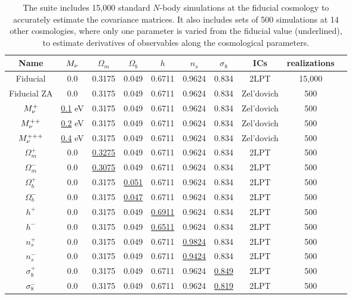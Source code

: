 \begin{table}
\caption{
The \quij suite includes 15,000 standard $N$-body simulations at the fiducial cosmology to 
accurately estimate the covariance matrices. It also includes sets of 500 simulations at 14 
other cosmologies, where only one parameter is varied from the fiducial value (underlined), 
to estimate derivatives of observables along the cosmological parameters.
} 
\begin{center}
\begin{tabular}{cccccccccc} \toprule
Name  &$M_\nu$ & $\Omega_m$ & $\Omega_b$ & $h$ & $n_s$ & $\sigma_8$ & ICs & realizations \\[3pt] \hline\hline
Fiducial 	& 0.0         & 0.3175 & 0.049 & 0.6711 & 0.9624 & 0.834 & 2LPT & 15,000 \\ 
Fiducial ZA     & 0.0         & 0.3175 & 0.049 & 0.6711 & 0.9624 & 0.834 & Zel'dovich& 500 \\ 
$M_\nu^+$       & \underline{0.1} eV & 0.3175 & 0.049 & 0.6711 & 0.9624 & 0.834 & Zel'dovich & 500 \\ 
$M_\nu^{++}$    & \underline{0.2} eV & 0.3175 & 0.049 & 0.6711 & 0.9624 & 0.834 & Zel'dovich & 500 \\ 
$M_\nu^{+++}$   & \underline{0.4} eV & 0.3175 & 0.049 & 0.6711 & 0.9624 & 0.834 & Zel'dovich & 500 \\ 
$\Omega_m^+$    & 0.0   & \underline{ 0.3275} & 0.049 & 0.6711 & 0.9624 & 0.834 & 2LPT & 500 \\ 
$\Omega_m^-$    & 0.0   & \underline{ 0.3075} & 0.049 & 0.6711 & 0.9624 & 0.834 & 2LPT & 500 \\ 
$\Omega_b^+$    & 0.0   & 0.3175 & \underline{0.051} & 0.6711 & 0.9624 & 0.834 & 2LPT & 500 \\ 
$\Omega_b^-$    & 0.0   & 0.3175 & \underline{0.047} & 0.6711 & 0.9624 & 0.834 & 2LPT & 500 \\ 
$h^+$           & 0.0   & 0.3175 & 0.049 & \underline{0.6911} & 0.9624 & 0.834 & 2LPT & 500 \\ 
$h^-$           & 0.0   & 0.3175 & 0.049 & \underline{0.6511} & 0.9624 & 0.834 & 2LPT & 500 \\ 
$n_s^+$         & 0.0   & 0.3175 & 0.049 & 0.6711 & \underline{0.9824} & 0.834 & 2LPT & 500 \\ 
$n_s^-$         & 0.0   & 0.3175 & 0.049 & 0.6711 & \underline{0.9424} & 0.834 & 2LPT & 500 \\ 
$\sigma_8^+$    & 0.0   & 0.3175 & 0.049 & 0.6711 & 0.9624 & \underline{0.849} & 2LPT & 500 \\ 
$\sigma_8^-$    & 0.0   & 0.3175 & 0.049 & 0.6711 & 0.9624 & \underline{0.819} & 2LPT & 500 \\[3pt]
\hline
\end{tabular} \label{tab:sims}
\end{center}
\end{table}
